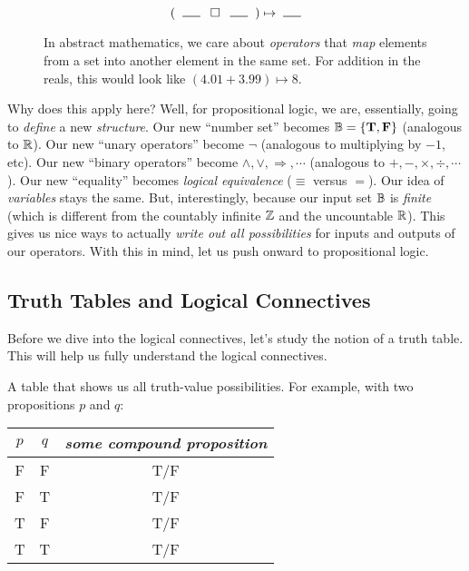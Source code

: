\documentclass[main.tex]{subfiles}
\begin{document}
\begin{figure}[h]
	\centering
	\[(\hspace{2mm} \rule{0.5cm}{0.5pt} \hspace{2mm} \mathbin{\square} \hspace{2mm} \rule{0.5cm}{0.5pt} \hspace{2mm}) \mapsto \hspace{1mm} \rule{0.5cm}{0.5pt}\]
	\caption{
		In abstract mathematics, we care about \textit{operators} that \textit{map} elements from a set into another element in the same set.
		For addition in the reals, this would look like \((4.01+3.99) \mapsto 8\).
	}
\end{figure}

Why does this apply here?
Well, for propositional logic, we are, essentially, going to \textit{define} a new \textit{structure}.
Our new ``number set'' becomes \(\mathbb{B} = \{\mathbf{T},\mathbf{F}\}\) (analogous to \(\mathbb{R}\)).
Our new ``unary operators'' become \(\lnot\) (analogous to multiplying by \(-1\), etc).
Our new ``binary operators'' become \(\land,\lor,\Rightarrow,\cdots\) (analogous to \(+,-,\times,\div,\cdots\)).
Our new ``equality'' becomes \textit{logical equivalence} (\(\equiv\) versus \(=\)).
Our idea of \textit{variables} stays the same.
But, interestingly, because our input set \(\mathbb{B}\) is \textit{finite} (which is different from the countably infinite \(\mathbb{Z}\) and the uncountable \(\mathbb{R}\)).
This gives us nice ways to actually \textit{write out all possibilities} for inputs and outputs of our operators.
With this in mind, let us push onward to propositional logic.

\subsection{Truth Tables and Logical Connectives}

Before we dive into the logical connectives, let's study the notion of a truth table. This will help us fully understand the logical connectives.

\begin{defn}
	A table that shows us all truth-value possibilities. For example, with two propositions \(p\) and \(q\):
	
	\begin{center}
		\begin{tabular}{c|c|c}
			\(p\) & \(q\) & \textit{some compound proposition} \\
			\hline
			F & F & T/F \\
			F & T & T/F \\
			T & F & T/F \\
			T & T & T/F
		\end{tabular}
	\end{center}
\end{defn}
\end{document}
